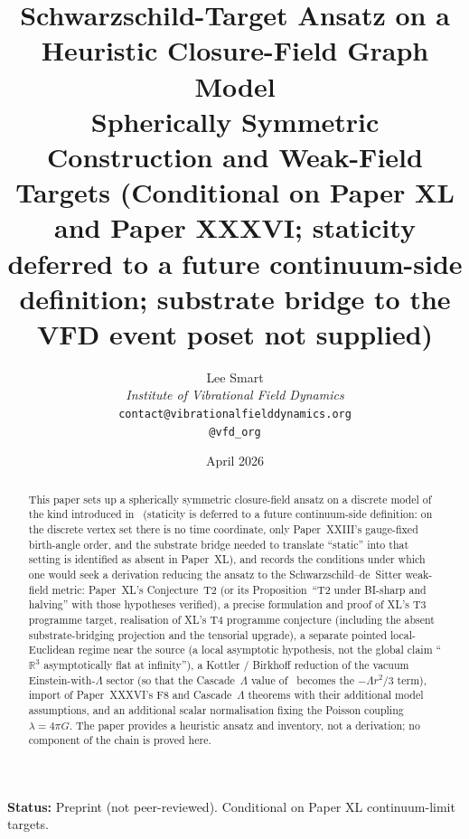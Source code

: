 \documentclass[12pt]{article}
\title{Schwarzschild-Target Ansatz on a Heuristic Closure-Field Graph Model\\[6pt]
\large Spherically Symmetric Construction and Weak-Field Targets (Conditional on Paper XL and Paper XXXVI; staticity deferred to a future continuum-side definition; substrate bridge to the VFD event poset not supplied)}
\author{%
  Lee Smart\\[4pt]
  \textit{Institute of Vibrational Field Dynamics}\\[2pt]
  \texttt{contact@vibrationalfielddynamics.org}\\[2pt]
  \texttt{@vfd\_org}%
}
\date{April 2026}
\theoremstyle{definition}
\theoremstyle{remark}
\begin{document}
\maketitle

\noindent\textbf{Status:} Preprint (not peer-reviewed). Conditional on Paper XL continuum-limit targets.

\begin{abstract}
This paper sets up a spherically symmetric closure-field ansatz on a discrete model of the kind introduced in~\citep{SmartXXVII} (staticity is deferred to a future continuum-side definition: on the discrete vertex set there is no time coordinate, only Paper~XXIII's gauge-fixed birth-angle order, and the substrate bridge needed to translate ``static'' into that setting is identified as absent in Paper~XL), and records the conditions under which one would seek a derivation reducing the ansatz to the Schwarzschild--de~Sitter weak-field metric: Paper~XL's Conjecture~T2 (or its Proposition~``T2 under BI-sharp and halving'' with those hypotheses verified), a precise formulation and proof of XL's T3 programme target, realisation of XL's T4 programme conjecture (including the absent substrate-bridging projection and the tensorial upgrade), a separate pointed local-Euclidean regime near the source (a local asymptotic hypothesis, not the global claim ``$\mathbb{R}^3$ asymptotically flat at infinity''), a Kottler / Birkhoff reduction of the vacuum Einstein-with-$\Lambda$ sector (so that the Cascade~$\Lambda$ value of~\citep{SmartXXXVI} becomes the $-\Lambda r^2/3$ term), import of Paper~XXXVI's F8 and Cascade~$\Lambda$ theorems with their additional model assumptions, and an additional scalar normalisation fixing the Poisson coupling $\lambda = 4\pi G$. The paper provides a heuristic ansatz and inventory, not a derivation; no component of the chain is proved here.


\end{abstract}
\end{document}
